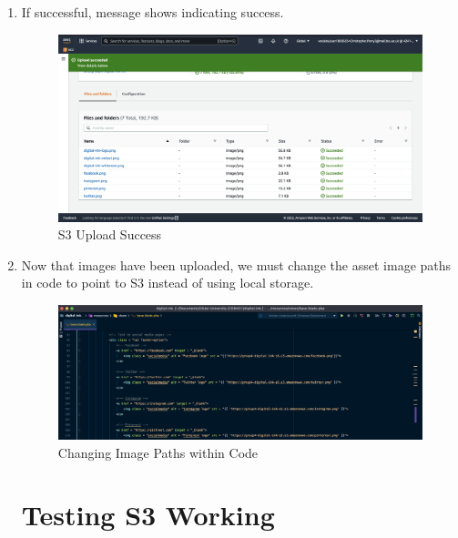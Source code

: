 \begin{enumerate}
    \item If successful, message shows indicating success.
        \begin{figure}[H]
            \centering
            \includegraphics[width=\textwidth]{resources/s3/s3-uploaded.png}
            \caption{S3 Upload Success}
            \label{fig:s3-uploaded}
        \end{figure}

    \item Now that images have been uploaded, we must change the asset image paths in code to point to S3 instead of using local storage.
        \begin{figure}[H]
            \centering
            \includegraphics[width=\textwidth]{resources/s3/s3-url-change.png}
            \caption{Changing Image Paths within Code}
            \label{fig:s3-url-change}
        \end{figure}

    \section{Testing S3 Working}


\end{enumerate}
